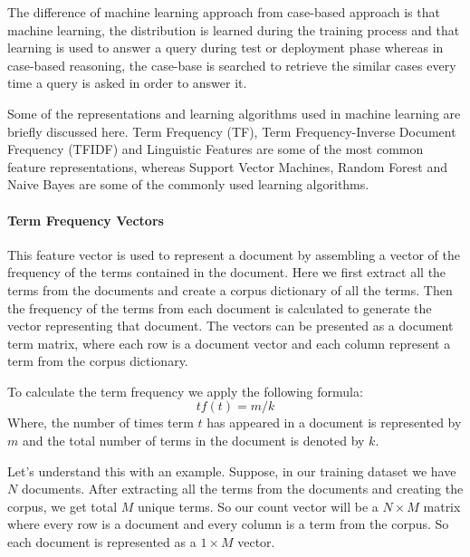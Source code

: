The difference of machine learning approach from case-based approach is that machine learning, the distribution is learned during the training process and that learning is used to answer a query during test or deployment phase whereas in case-based reasoning, the case-base is searched to retrieve the similar cases every time a query is asked in order to answer it.

Some of the representations and learning algorithms used in machine learning are briefly discussed here. Term Frequency (TF), Term Frequency-Inverse Document Frequency (TFIDF) and Linguistic Features are some of the most common feature representations, whereas Support Vector Machines, Random Forest and Naive Bayes are some of the commonly used learning algorithms.

\paragraph{Term Frequency Vectors}
This feature vector is used to represent a document by assembling a vector of the frequency of the terms contained in the document. Here we first extract all the terms from the  documents and  create a corpus dictionary of all the terms. Then the frequency of  the terms from each document is calculated to generate the vector representing that document. The vectors can be presented as a document term matrix, where each row  is a document vector and each column represent a term from the corpus dictionary.

To calculate the term frequency we apply the following formula: 
\begin{equation}
tf(t) = m/k
\end{equation}
Where, the number of times term $t$ has appeared in a document is represented by $m$ and the total number of terms in the document is denoted by $k$.

Let's understand this with an example. Suppose, in our training dataset we have $N$ documents. After extracting all the terms from the documents and creating the corpus, we get total $M$ unique terms. So our count vector will be a $N\times M$ matrix where every row is a document and every column is a term from the corpus. So each document is represented as a $1\times M$ vector.


